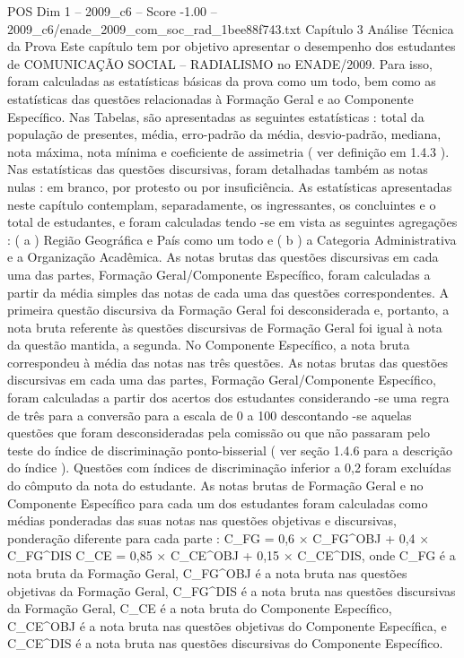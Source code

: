 \begin{textsample}{POS Dim 1 – 2009\_c6 – Score -1.00 – 2009\_c6/enade\_2009\_com\_soc\_rad\_1bee88f743.txt}  \label{ex:f1_pos_223}
Capítulo 3 Análise Técnica da Prova Este capítulo tem por objetivo apresentar o desempenho dos estudantes de COMUNICAÇÃO SOCIAL – RADIALISMO no ENADE/2009.
Para isso, foram calculadas as estatísticas básicas da prova como um todo, bem como as estatísticas das questões relacionadas à Formação Geral e ao Componente Específico.
Nas Tabelas, são apresentadas as seguintes estatísticas : total da população de presentes, média, erro-padrão da média, desvio-padrão, mediana, nota máxima, nota mínima e coeficiente de assimetria ( ver definição em 1.4.3 ).
Nas estatísticas das questões discursivas, foram detalhadas também as notas nulas : em branco, por protesto ou por insuficiência.
As estatísticas apresentadas neste capítulo contemplam, separadamente, os ingressantes, os concluintes e o total de estudantes, e foram calculadas tendo -se em vista as seguintes agregações : ( a ) Região Geográfica e País como um todo e ( b ) a Categoria Administrativa e a Organização Acadêmica.
As notas brutas das questões discursivas em cada uma das partes, Formação Geral/Componente Específico, foram calculadas a partir da média simples das notas de cada uma das questões correspondentes.
A primeira questão discursiva da Formação Geral foi desconsiderada e, portanto, a nota bruta referente às questões discursivas de Formação Geral foi igual à nota da questão mantida, a segunda.
No Componente Específico, a nota bruta correspondeu à média das notas nas três questões.
As notas brutas das questões discursivas em cada uma das partes, Formação Geral/Componente Específico, foram calculadas a partir dos acertos dos estudantes considerando -se uma regra de três para a conversão para a escala de 0 a 100 descontando -se aquelas questões que foram desconsideradas pela comissão ou que não passaram pelo teste do índice de discriminação ponto-bisserial ( ver seção 1.4.6 para a descrição do índice ).
Questões com índices de discriminação inferior a 0,2 foram excluídas do cômputo da nota do estudante.
As notas brutas de Formação Geral e no Componente Específico para cada um dos estudantes foram calculadas como médias ponderadas das suas notas nas questões objetivas e discursivas, ponderação diferente para cada parte : C\_FG = 0,6 × C\_FG\textasciicircum{}OBJ + 0,4 × C\_FG\textasciicircum{}DIS C\_CE = 0,85 × C\_CE\textasciicircum{}OBJ + 0,15 × C\_CE\textasciicircum{}DIS, onde C\_FG é a nota bruta da Formação Geral, C\_FG\textasciicircum{}OBJ é a nota bruta nas questões objetivas da Formação Geral, C\_FG\textasciicircum{}DIS é a nota bruta nas questões discursivas da Formação Geral, C\_CE é a nota bruta do Componente Específico, C\_CE\textasciicircum{}OBJ é a nota bruta nas questões objetivas do Componente Específica, e C\_CE\textasciicircum{}DIS é a nota bruta nas questões discursivas do Componente Específico.

\end{textsample}
